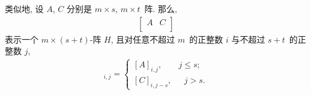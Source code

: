 \documentclass[%
    UTF8,%
    fontset=none,%
    punct=kaiming,%
    zihao=-4,%
    a4paper,%
    oneside,%
]{ctexbook}
\renewcommand*{\leq}{\leqslant}
\begin{document}
类似地, 设 \(A\), \(C\)
分别是 \(m \times s\), \(m \times t\)~阵.
那么,
\begin{align*}
    \begin{bmatrix}
        A & C \\
    \end{bmatrix}
\end{align*}
表示一个 \(m \times (s + t)\)-阵 \(H\),
且对任意不超过 \(m\)~的正整数 \(i\)
与不超过 \(s + t\)~的正整数 \(j\),
\begin{align*}
    [H]_{i,j}
    = \begin{cases}
          [A]_{i,j},
           & \text{\(j \leq s\)}; \\
          [C]_{i,j-s},
           & \text{ \(j > s\)}.
      \end{cases}
\end{align*}
\end{document}
